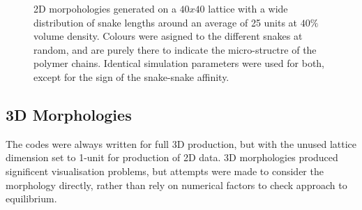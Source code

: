 \documentclass[twocolumn,a4,notitlepage]{report}
\begin{document}
\begin{figure}[htb]
\centering
{}
\caption{
2D morpohologies generated on a $40x40$ lattice with a wide distribution
of snake lengths around an average of 25 units 
at $40\%$ volume density.
Colours were asigned to the different snakes at random, and are purely there
to indicate the micro-structre of the polymer chains. 
Identical simulation parameters were used for both,
except for the sign of the snake-snake affinity.}
\label{2d_morphology}

\end{figure}


\subsection{3D Morphologies}

The codes were always written for full 3D production, but with the unused
lattice dimension set to 1-unit for production of 2D data. 3D morphologies
produced significent visualisation problems, but attempts were made to
consider the morphology directly, rather than rely on numerical factors to
check approach to equilibrium.
\end{document}
